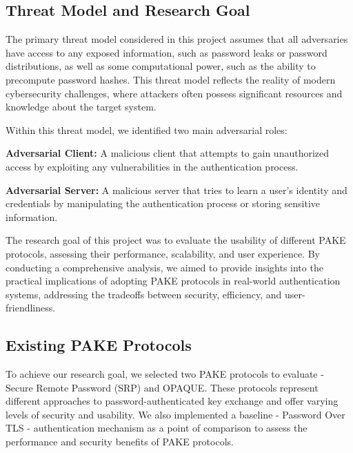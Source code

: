 \subsection{Threat Model and Research Goal}
\label{sec:threatmodel}

The primary threat model considered in this project assumes that all adversaries have access to any exposed information, such as password leaks or password distributions, as well as some computational power, such as the ability to precompute password hashes. This threat model reflects the reality of modern cybersecurity challenges, where attackers often possess significant resources and knowledge about the target system.

Within this threat model, we identified two main adversarial roles:

\begin{newitemize}
  \item \textbf{Adversarial Client:} A malicious client that attempts to gain unauthorized access by exploiting any vulnerabilities in the authentication process.
  \item \textbf{Adversarial Server:} A malicious server that tries to learn a user's identity and credentials by manipulating the authentication process or storing sensitive information.
\end{newitemize}

The research goal of this project was to evaluate the usability of different PAKE protocols, assessing their performance, scalability, and user experience. By conducting a comprehensive analysis, we aimed to provide insights into the practical implications of adopting PAKE protocols in real-world authentication systems, addressing the tradeoffs between security, efficiency, and user-friendliness.

\subsection{Existing PAKE Protocols}
\label{sec:existpake}

To achieve our research goal, we selected two PAKE protocols to evaluate - Secure Remote Password (SRP) and OPAQUE. These protocols represent different approaches to password-authenticated key exchange and offer varying levels of security and usability. We also implemented a baseline - Password Over TLS - authentication mechanism as a point of comparison to assess the performance and security benefits of PAKE protocols.

